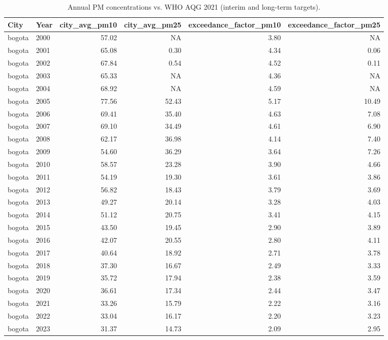 \begin{table}[!htbp]\centering
\caption{Annual PM concentrations vs. WHO AQG 2021 (interim and long-term targets).}
\label{tab:who_exceedances}
\begin{tabular}{ll
rrrr
}
\toprule
City & Year & city_avg_pm10 & city_avg_pm25 & exceedance_factor_pm10 & exceedance_factor_pm25
\\
\midrule
bogota & 2000 & 57.02 &  NA & 3.80 &  NA \\
bogota & 2001 & 65.08 & 0.30 & 4.34 & 0.06 \\
bogota & 2002 & 67.84 & 0.54 & 4.52 & 0.11 \\
bogota & 2003 & 65.33 &  NA & 4.36 &  NA \\
bogota & 2004 & 68.92 &  NA & 4.59 &  NA \\
bogota & 2005 & 77.56 & 52.43 & 5.17 & 10.49 \\
bogota & 2006 & 69.41 & 35.40 & 4.63 & 7.08 \\
bogota & 2007 & 69.10 & 34.49 & 4.61 & 6.90 \\
bogota & 2008 & 62.17 & 36.98 & 4.14 & 7.40 \\
bogota & 2009 & 54.60 & 36.29 & 3.64 & 7.26 \\
bogota & 2010 & 58.57 & 23.28 & 3.90 & 4.66 \\
bogota & 2011 & 54.19 & 19.30 & 3.61 & 3.86 \\
bogota & 2012 & 56.82 & 18.43 & 3.79 & 3.69 \\
bogota & 2013 & 49.27 & 20.14 & 3.28 & 4.03 \\
bogota & 2014 & 51.12 & 20.75 & 3.41 & 4.15 \\
bogota & 2015 & 43.50 & 19.45 & 2.90 & 3.89 \\
bogota & 2016 & 42.07 & 20.55 & 2.80 & 4.11 \\
bogota & 2017 & 40.64 & 18.92 & 2.71 & 3.78 \\
bogota & 2018 & 37.30 & 16.67 & 2.49 & 3.33 \\
bogota & 2019 & 35.72 & 17.94 & 2.38 & 3.59 \\
bogota & 2020 & 36.61 & 17.34 & 2.44 & 3.47 \\
bogota & 2021 & 33.26 & 15.79 & 2.22 & 3.16 \\
bogota & 2022 & 33.04 & 16.17 & 2.20 & 3.23 \\
bogota & 2023 & 31.37 & 14.73 & 2.09 & 2.95 \\
\bottomrule
\end{tabular}
\end{table}
